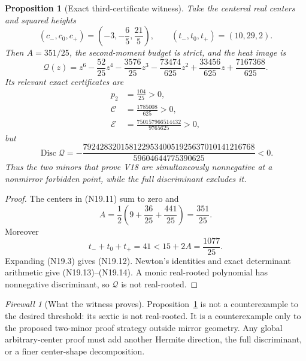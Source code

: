 \documentclass[11pt]{article}
\newtheorem{proposition}[theorem]{Proposition}
\theoremstyle{definition}
\theoremstyle{remark}
\newtheorem{firewall}[theorem]{Firewall}
\begin{document}
\begin{proposition}[Exact third-certificate witness]
\label{prop:f2v19-third-witness}
Take the centered real centers and squared heights
\[
 (c_-,c_0,c_+)
 =\left(-3,-\frac65,\frac{21}{5}\right),
 \qquad
 (t_-,t_0,t_+)=(10,29,2).
 \tag{N19.11}
\]
Then \(A=351/25\), the second-moment budget is strict, and the heat image is
\[
 \mathcal Q(z)
 =z^6-\frac{52}{25}z^4-\frac{3576}{25}z^3
   -\frac{73474}{625}z^2+\frac{33456}{625}z
   +\frac{7167368}{625}.
 \tag{N19.12}
\]
Its relevant exact certificates are
\[
\begin{aligned}
 p_2&=\frac{104}{25}>0,\\
 \mathcal C&=\frac{1785008}{625}>0,\\
 \mathcal E&=\frac{750157966514432}{9765625}>0,
\end{aligned}
\tag{N19.13}
\]
but
\[
 \operatorname{Disc}\mathcal Q
 =-\frac{
 79242832015812295340051925637010141216768
 }{59604644775390625}<0.
 \tag{N19.14}
\]
Thus the two minors that prove V18 are simultaneously nonnegative at a
nonmirror forbidden point, while the full discriminant excludes it.
\end{proposition}

\begin{proof}
The centers in \textup{(N19.11)} sum to zero and
\[
 A=\frac12\left(9+\frac{36}{25}+\frac{441}{25}\right)
 =\frac{351}{25}.
\]
Moreover
\[
 t_-+t_0+t_+=41
 <15+2A=\frac{1077}{25}.
\]
Expanding \textup{(N19.3)} gives \textup{(N19.12)}.  Newton's identities
and exact determinant arithmetic give
\textup{(N19.13)}--\textup{(N19.14)}.  A monic real-rooted polynomial has
nonnegative discriminant, so \(\mathcal Q\) is not real-rooted.
\end{proof}

\begin{firewall}[What the witness proves]
Proposition~\ref{prop:f2v19-third-witness} is not a counterexample to the
desired threshold: its sextic is not real-rooted.  It is a counterexample
only to the proposed two-minor proof strategy outside mirror geometry.
Any global arbitrary-center proof must add another Hermite direction,
the full discriminant, or a finer center-shape decomposition.
\end{firewall}
\end{document}
